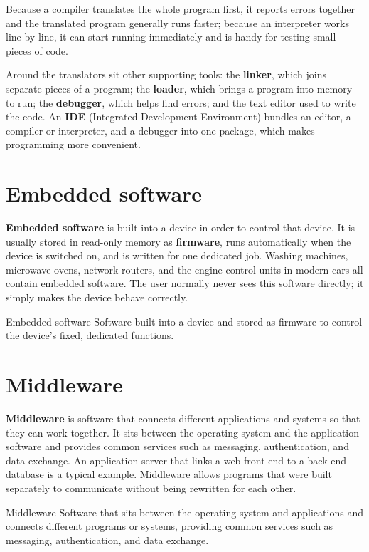 Because a compiler translates the whole program first, it reports errors
together and the translated program generally runs faster; because an
interpreter works line by line, it can start running immediately and is
handy for testing small pieces of code.

Around the translators sit other supporting tools: the \textbf{linker}, which
joins separate pieces of a program; the \textbf{loader}, which brings a program
into memory to run; the \textbf{debugger}, which helps find errors; and the
text editor used to write the code. An \textbf{IDE} (Integrated Development
Environment) bundles an editor, a compiler or interpreter, and a debugger into
one package, which makes programming more convenient.

\section{Embedded software}
\textbf{Embedded software} is built into a device in order to control that
device. It is usually stored in read-only memory as \textbf{firmware}, runs
automatically when the device is switched on, and is written for one dedicated
job. Washing machines, microwave ovens, network routers, and the
engine-control units in modern cars all contain embedded software. The user
normally never sees this software directly; it simply makes the device behave
correctly.

\begin{definitionbox}{Embedded software}
Software built into a device and stored as firmware to control the device's
fixed, dedicated functions.
\end{definitionbox}

\section{Middleware}
\textbf{Middleware} is software that connects different applications and
systems so that they can work together. It sits between the operating system
and the application software and provides common services such as messaging,
authentication, and data exchange. An application server that links a web
front end to a back-end database is a typical example. Middleware allows
programs that were built separately to communicate without being rewritten
for each other.

\begin{definitionbox}{Middleware}
Software that sits between the operating system and applications and connects
different programs or systems, providing common services such as messaging,
authentication, and data exchange.
\end{definitionbox}

